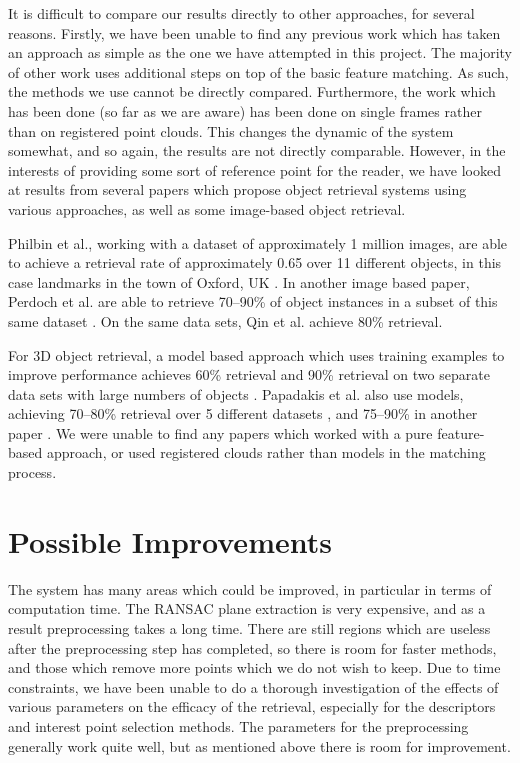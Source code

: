 \documentclass[11pt,a4paper]{kth-mag}
\begin{document}
It is difficult to compare our results directly to other approaches, for several
reasons. Firstly, we have been unable to find any previous work which has taken
an approach as simple as the one we have attempted in this project. The majority
of other work uses additional steps on top of the basic feature matching. As
such, the methods we use cannot be directly compared. Furthermore, the work
which has been done (so far as we are aware) has been done on single frames
rather than on registered point clouds. This changes the dynamic of the system
somewhat, and so again, the results are not directly comparable. However, in the
interests of providing some sort of reference point for the reader, we have
looked at results from several papers which propose object retrieval systems
using various approaches, as well as some image-based object retrieval.

Philbin et al., working with a dataset of approximately 1 million images, are
able to achieve a retrieval rate of approximately 0.65 over 11 different
objects, in this case landmarks in the town of Oxford, UK
\cite{philbin2007object}. In another image based paper, Perdoch et al. are able
to retrieve 70--90\% of object instances in a subset of this same dataset
\cite{perd2009efficient}. On the same data sets, Qin et al. achieve 80\%
retrieval\cite{qin2011hello}.

For 3D object retrieval, a model based approach which uses training examples to
improve performance achieves 60\% retrieval and 90\% retrieval on two separate
data sets with large numbers of objects \cite{gao20123}. Papadakis et al. also
use models, achieving 70--80\% retrieval over 5 different datasets
\cite{papadakis20083d}, and 75--90\% in another paper
\cite{papadakis2010panorama}. We were unable to find any papers which worked
with a pure feature-based approach, or used registered clouds rather than models
in the matching process.

\section{Possible Improvements}
The system has many areas which could be improved, in particular in terms of
computation time. The RANSAC plane extraction is very expensive, and as a result
preprocessing takes a long time. There are still regions which are useless after
the preprocessing step has completed, so there is room for faster methods, and
those which remove more points which we do not wish to keep. Due to time
constraints, we have been unable to do a thorough investigation of the effects
of various parameters on the efficacy of the retrieval, especially for the
descriptors and interest point selection methods. The parameters for the
preprocessing generally work quite well, but as mentioned above there is room
for improvement.
\end{document}

